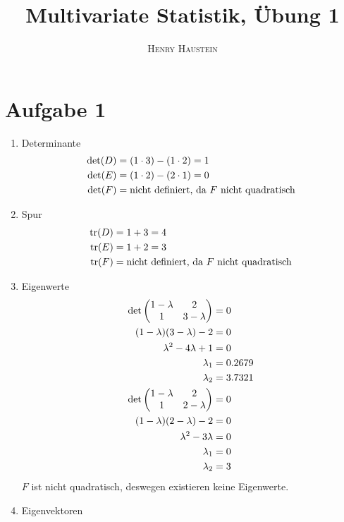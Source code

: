 \documentclass{article}
\title{\textbf{Multivariate Statistik, Übung 1}}
\author{\textsc{Henry Haustein}}
\date{}
\DeclareMathOperator{\tr}{tr}
\begin{document}
	\maketitle
	
	\section*{Aufgabe 1}
	\begin{enumerate}[label=(\alph*)]
		\item Determinante
		\begin{align}
			\det(D) &= (1\cdot 3) - (1\cdot 2) = 1 \notag \\
			\det(E) &= (1\cdot 2) - (2\cdot 1) = 0 \notag \\
			\det(F) &= \text{nicht definiert, da $F$ nicht quadratisch} \notag
		\end{align}
		\item Spur
		\begin{align}
			\tr(D) &= 1 + 3 = 4 \notag \\
			\tr(E) &= 1 + 2 = 3 \notag \\
			\tr(F) &= \text{nicht definiert, da $F$ nicht quadratisch} \notag
		\end{align}
		\item Eigenwerte
		\begin{align}
			\det\begin{pmatrix}
				1-\lambda & 2 \\ 1 & 3-\lambda
			\end{pmatrix} &= 0 \notag \\
			(1-\lambda)(3-\lambda)-2 &= 0 \notag \\
			\lambda^2 - 4\lambda + 1 &= 0 \notag \\
			\lambda_1 &= 0.2679 \notag \\
			\lambda_2 &= 3.7321 \notag \\
			\det\begin{pmatrix}
				1-\lambda & 2 \\ 1 & 2-\lambda
			\end{pmatrix} &= 0 \notag \\
			(1-\lambda)(2-\lambda)-2 &= 0 \notag \\
			\lambda^2 - 3\lambda &= 0 \notag \\
			\lambda_1 &= 0 \notag \\
			\lambda_2 &= 3 \notag
		\end{align}
		$F$ ist nicht quadratisch, deswegen existieren keine Eigenwerte.
		\item Eigenvektoren

\end{enumerate}
\end{document}
